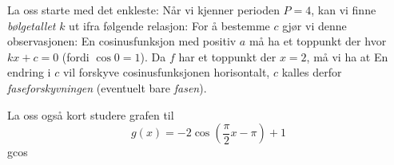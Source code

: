 La oss starte med det enkleste: Når vi kjenner perioden $ {P=4 }$, kan vi finne \textit{bølgetallet} $ k $ ut ifra følgende relasjon:
For å bestemme $ c $ gjør vi denne observasjonen: En cosinusfunksjon med positiv $ a $ må ha et toppunkt der hvor $ {kx+c=0} $ (fordi $ \cos 0=1 $). Da $ f $ har et toppunkt der $ {x=2} $, må vi ha at
En endring i $ c $ vil forskyve cosinusfunksjonen horisontalt, $ c $ kalles derfor \textit{faseforskyvningen} (eventuelt bare \textit{fasen}).\vsk

La oss også kort studere grafen til
\[ {g(x) = -2\cos\left(\frac{\pi}{2}x-\pi\right)+1} \]
{gcos}

